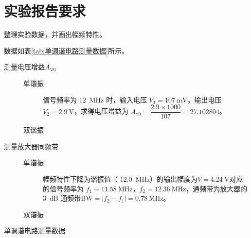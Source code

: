 \documentclass[../main]{subfiles}
\begin{document}
\section{实验报告要求}%
\label{sec:\arabic{chapter}实验报告要求}

\begin{Exercise}

	整理实验数据，并画出幅频特性。

\end{Exercise}

\begin{Answer}

	数据如表\ref{tab:单调谐电路测量数据}所示。

	\begin{description}

		\item[测量电压增益$ A_\mathrm{V0} $]

			\begin{description}

				\item[单谐振] 信号频率为 \SI{12}{MHz} 时，输入电压
					$ V_1 = \SI{107}{\mV} $，输出电压$ V_2
					= \SI{2.9}{\V} $，求得电压增益为 $
					A_\mathrm{v0} = \dfrac{2.9\times
					1000}{107} = 27.102804 $。

				\item[双谐振]

			\end{description}

		\item[测量放大器同频带]

			\begin{description}

				\item[单谐振] 幅频特性下降为谐振值（
					\SI{12.0}{\MHz}）的输出幅度为$ V =
					\SI{4.24}{\V} $对应的信号频率为 $ f_1 =
					\SI{11.58}{\MHz} $，$ f_2 =
					\SI{12.36}{\MHz} $，通频带为放大器的
					\SI{3}{\dB} 通频带$ \mathrm{BW} = |f_2 -
					f_1| = \SI{0.78}{\MHz} $。

				\item[双谐振]

			\end{description}

	\end{description}

\end{Answer}

\begin{table}[htbp]
	\centering
	\caption{单调谐电路测量数据}
	\label{tab:单调谐电路测量数据}
\end{table}
\end{document}
